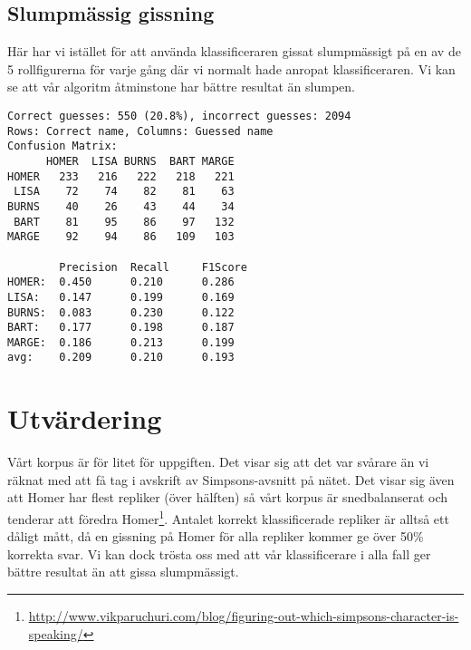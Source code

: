 \documentclass[a4paper]{article}
\begin{document}
\subsection{Slumpmässig gissning}
Här har vi istället för att använda klassificeraren gissat slumpmässigt på en av
de 5 rollfigurerna för varje gång där vi normalt hade anropat klassificeraren.
Vi kan se att vår algoritm åtminstone har bättre resultat än slumpen.
\begin{verbatim}
Correct guesses: 550 (20.8%), incorrect guesses: 2094
Rows: Correct name, Columns: Guessed name
Confusion Matrix:
      HOMER  LISA BURNS  BART MARGE 
HOMER   233   216   222   218   221 
 LISA    72    74    82    81    63 
BURNS    40    26    43    44    34 
 BART    81    95    86    97   132 
MARGE    92    94    86   109   103 

        Precision  Recall     F1Score    
HOMER:  0.450      0.210      0.286      
LISA:   0.147      0.199      0.169      
BURNS:  0.083      0.230      0.122      
BART:   0.177      0.198      0.187      
MARGE:  0.186      0.213      0.199      
avg:    0.209      0.210      0.193      
\end{verbatim}



\section{Utvärdering}
Vårt korpus är för litet för uppgiften. Det visar sig att det var svårare än vi
räknat med att få tag i avskrift av Simpsons-avsnitt på nätet. Det visar sig
även att Homer har flest repliker (över hälften) så vårt korpus är
snedbalanserat och tenderar att föredra
Homer\footnote{\url{http://www.vikparuchuri.com/blog/figuring-out-which-simpsons-character-is-speaking/}}.
Antalet korrekt klassificerade repliker är alltså ett dåligt mått, då en
gissning på Homer för alla repliker kommer ge över 50\% korrekta svar. Vi kan
dock trösta oss med att vår klassificerare i alla fall ger bättre resultat än
att gissa slumpmässigt.


\end{document}
